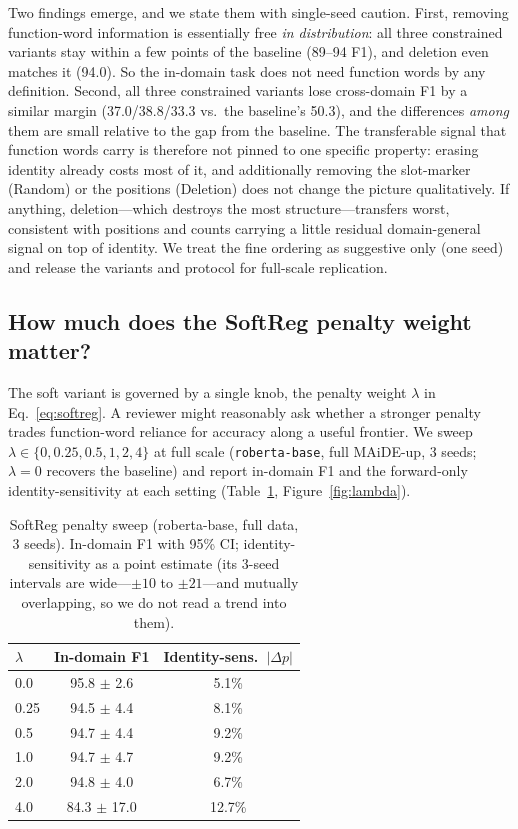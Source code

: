 \documentclass[10pt,twocolumn]{article}
\begin{document}
Two findings emerge, and we state them with single-seed caution. First, removing function-word information is essentially free \emph{in distribution}: all three constrained variants stay within a few points of the baseline (89--94 F1), and deletion even matches it (94.0). So the in-domain task does not need function words by any definition. Second, all three constrained variants lose cross-domain F1 by a similar margin (37.0/38.8/33.3 vs.\ the baseline's 50.3), and the differences \emph{among} them are small relative to the gap from the baseline. The transferable signal that function words carry is therefore not pinned to one specific property: erasing identity already costs most of it, and additionally removing the slot-marker (Random) or the positions (Deletion) does not change the picture qualitatively. If anything, deletion---which destroys the most structure---transfers worst, consistent with positions and counts carrying a little residual domain-general signal on top of identity. We treat the fine ordering as suggestive only (one seed) and release the variants and protocol for full-scale replication.

\subsection{How much does the SoftReg penalty weight matter?}\label{sec:lambda}
The soft variant is governed by a single knob, the penalty weight $\lambda$ in Eq.~\ref{eq:softreg}. A reviewer might reasonably ask whether a stronger penalty trades function-word reliance for accuracy along a useful frontier. We sweep $\lambda \in \{0, 0.25, 0.5, 1, 2, 4\}$ at full scale (\texttt{roberta-base}, full MAiDE-up, 3 seeds; $\lambda{=}0$ recovers the baseline) and report in-domain F1 and the forward-only identity-sensitivity at each setting (Table~\ref{tab:lambda}, Figure~\ref{fig:lambda}).

\begin{table}[tb]\centering
\caption{SoftReg penalty sweep (roberta-base, full data, 3 seeds). In-domain F1 with 95\% CI; identity-sensitivity as a point estimate (its 3-seed intervals are wide---$\pm10$ to $\pm21$---and mutually overlapping, so we do not read a trend into them).}
\label{tab:lambda}
\footnotesize
\begin{tabular}{lcc}
\toprule
$\lambda$ & In-domain F1 & Identity-sens.\ $|\Delta p|$ \\
\midrule
0.0 & 95.8 $\pm$ 2.6 & 5.1\% \\
0.25 & 94.5 $\pm$ 4.4 & 8.1\% \\
0.5 & 94.7 $\pm$ 4.4 & 9.2\% \\
1.0 & 94.7 $\pm$ 4.7 & 9.2\% \\
2.0 & 94.8 $\pm$ 4.0 & 6.7\% \\
4.0 & 84.3 $\pm$ 17.0 & 12.7\% \\
\bottomrule
\end{tabular}
\end{table}
\end{document}
